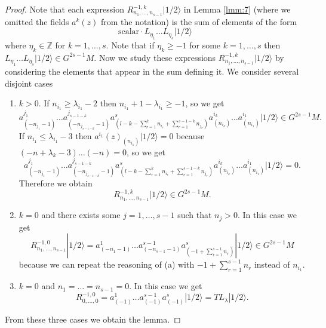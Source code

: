 \documentclass[12pt,a4paper]{article}
\newcommand{\vachalf}{|1/2\rangle}
\begin{document}
\begin{proof}
  Note that each expression $R^{-1,k}_{n_1,\dots,n_{s-1}}\vachalf$ in Lemma \ref{lmm:7} (where we omitted the fields $a^k(z)$ from the notation) is the sum of elements of the form
  \begin{equation*}
    \text{scalar}\cdot L_{\eta_1}\dots L_{\eta_s}\vachalf
  \end{equation*}
  where $\eta_k\in \mathbb{Z}$ for $k=1,\dots,s$.
  Note that if $\eta_k\ge -1$ for some $k=1,\dots,s$ then $L_{\eta_1}\dots L_{\eta_s}\vachalf\in G^{2s-1}M$.
  Now we study these expressions $R^{-1,k}_{n_1,\dots,n_{s-1}}\vachalf$ by considering the elements that appear in the sum defining it.
  We consider several disjoint cases
  \begin{enumerate}[label={(\alph*)}]
  \item $k>0$. If $n_{i_1}\ge \lambda_{i_1}-2$ then $n_{i_1}+1-\lambda_{i_1}\ge -1$, so we get
    \begin{equation*}
      a^{j_1}_{(-n_{j_1}-1)}\dots a^{j_{s-1-k}}_{(-n_{j_{s-1-k}}-1)}a^s_{(l-k-\sum_{r=1}^k n_{i_r}+\sum_{r=1}^{s-1-k}n_{j_r})}a^{i_k}_{(n_{i_k})}\dots a^{i_1}_{(n_{i_1})}\vachalf\in G^{2s-1}M.
    \end{equation*}
    If $n_{i_1}\le \lambda_{i_1}-3$ then $a^{i_1}(z)_{(n_{i_1})}\vachalf=0$ because $(-n+\lambda_k-3)\dots(-n)=0$, so we get
    \begin{equation*}
      a^{j_1}_{(-n_{j_1}-1)}\dots a^{j_{s-1-k}}_{(-n_{j_{s-1-k}}-1)}a^s_{(l-k-\sum_{r=1}^k n_{i_r}+\sum_{r=1}^{s-1-k}n_{j_r})}a^{i_k}_{(n_{i_k})}\dots a^{i_1}_{(n_{i_1})}\vachalf=0.
    \end{equation*}
    Therefore we obtain
    \begin{equation*}
      R^{-1,k}_{n_1,\dots,n_{s-1}}\vachalf\in G^{2s-1}M.
    \end{equation*}
  \item $k=0$ and there exists some $j=1,\dots,s-1$ such that $n_j>0$.
    In this case we get
    \begin{equation*}
      R^{-1,0}_{n_1,\dots,n_{s-1}}\vachalf=a^1_{(-n_1-1)}\dots a^{s-1}_{(-n_{s-1}-1)}a^s_{(-1+\sum_{r=1}^{s-1}n_r)}\vachalf\in G^{2s-1}M
    \end{equation*}
    because we can repeat the reasoning of (a) with $-1+\sum_{r=1}^{s-1}n_r$ instead of $n_{i_1}$.
  \item $k=0$ and $n_1=\dots=n_{s-1}=0$. In this case we get
    \begin{equation*}
      R^{-1,0}_{0,\dots,0}=a^1_{(-1)}\dots a^{s-1}_{(-1)}a^s_{(-1)}\vachalf=TL_\lambda\vachalf.
    \end{equation*}
  \end{enumerate}
  From these three cases we obtain the lemma.
\end{proof}
\end{document}
